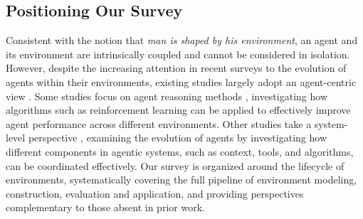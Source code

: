 \subsection{Positioning Our Survey}
Consistent with the notion that \textit{man is shaped by his environment}, an agent and its environment are intrinsically coupled and cannot be considered in isolation. However, despite the increasing attention in recent surveys to the evolution of agents within their environments, existing studies largely adopt an agent-centric view \cite{survey_agent_adaptation,survey_agent_reason, survey_agent_search, survey_agent_system, survey_agent_rl, survey_agent_efficient, survey_agent_evo}. Some studies focus on agent reasoning methods \cite{survey_agent_rl, survey_agent_search, survey_agent_reason}, investigating how algorithms such as reinforcement learning can be applied to effectively improve agent performance across different environments.
Other studies take a system-level perspective \cite{survey_agent_adaptation,survey_agent_evo,survey_agent_system}, examining the evolution of agents by investigating how different components in agentic systems, such as context, tools, and algorithms, can be coordinated effectively. Our survey is organized around the lifecycle of environments, systematically covering the full pipeline of environment modeling, construction, evaluation and application, and providing perspectives complementary to those absent in prior work.